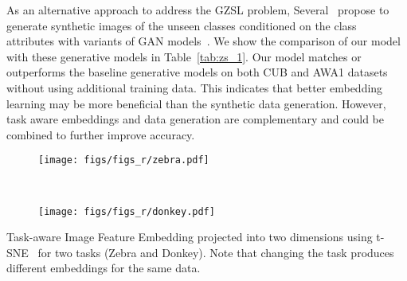 \documentclass[10pt,twocolumn,letterpaper]{article}
\begin{document}
As an alternative approach to address the GZSL problem, Several~\cite{xian2018feature, verma2017generalized} propose to generate synthetic 
images of the unseen classes conditioned on the class attributes with variants of GAN models~\cite{gan_goodfellow}. We show
the comparison of our model with these generative models in Table~\ref{tab:zs_1}. Our model matches or outperforms the
baseline generative models on both CUB and AWA1 datasets without using additional training data. 
This indicates that better embedding learning may be more beneficial than the synthetic data generation. 
However, task aware embeddings and data generation are complementary and could be combined to further improve accuracy.
    \centering
    \begin{subfigure}[t]{.8\linewidth}
        \centering
        \texttt{[image: figs/figs\_r/zebra.pdf]}
    \end{subfigure}%
    \\
    \vspace{2em}
    \begin{subfigure}[t]{.8\linewidth}
        \centering
        \texttt{[image: figs/figs\_r/donkey.pdf]}
    \end{subfigure}
    \caption{Task-aware Image Feature Embedding projected into two dimensions using t-SNE~\cite{tsne} for two tasks (Zebra and Donkey). Note that changing the task produces different embeddings for the same data.}
    \label{fig:tafe-vis}
\end{document}
